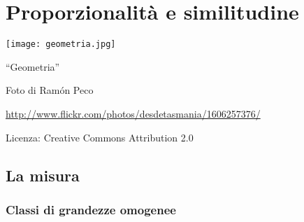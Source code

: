 \chapter{Proporzionalità e similitudine}

\texttt{[image: geometria.jpg]}
  \begin{center}
    {\large ``Geometria''}\par
    Foto di Ram\'on Peco\par
    \url{http://www.flickr.com/photos/desdetasmania/1606257376/}\par
    Licenza: Creative Commons Attribution 2.0\par
  \end{center}
\newpage


\section{La misura}

\subsection{Classi di grandezze omogenee}

